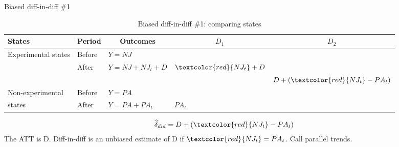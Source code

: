 \documentclass{beamer}
\begin{document}
\begin{frame}{Biased diff-in-diff \#1}

\begin{table}\centering
\scriptsize
		\caption{Biased diff-in-diff \#1: comparing states}
		\begin{center}
		\begin{tabular}{lll|lc}
		\toprule
		\multicolumn{1}{l}{\textbf{States}}&
		\multicolumn{1}{c}{\textbf{Period}}&
		\multicolumn{1}{c}{\textbf{Outcomes}}&
		\multicolumn{1}{c}{$D_1$}&
		\multicolumn{1}{c}{$D_2$}\\
		\midrule
		Experimental states & Before & $Y=NJ$ \\
		& After & $Y=NJ + NJ_t + D$ & $\textcolor{red}{NJ_t}+D$\\
		\midrule
		& & & & $D + (\textcolor{red}{NJ_t}- PA_t)$ \\
		\midrule
		Non-experimental  & Before & $Y=PA$ \\
		states& After & $Y=PA + PA_t$ & $PA_t$\\
		\bottomrule
		\end{tabular}
		\end{center}
	\end{table}

\begin{eqnarray*}
\widehat{\delta}_{did} = D + (\textcolor{red}{NJ_t}- PA_t)
\end{eqnarray*}The ATT is D. Diff-in-diff is an unbiased estimate of D if $\textcolor{red}{NJ_t} = PA_t$. Call parallel trends.

\end{frame}
\end{document}
